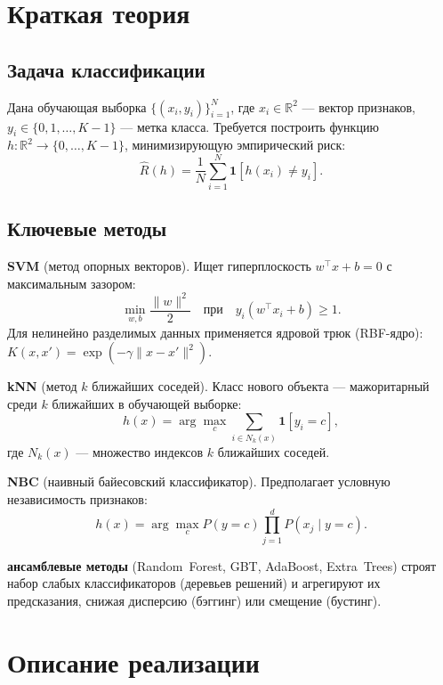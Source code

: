 \documentclass[14pt,a4paper]{extarticle}
\begin{document}
\section*{Краткая теория}

\subsection*{Задача классификации}

Дана обучающая выборка $\{(x_i, y_i)\}_{i=1}^{N}$, где $x_i \in \mathbb{R}^2$ ---
вектор признаков, $y_i \in \{0,1,\ldots,K-1\}$ --- метка класса.
Требуется построить функцию $h: \mathbb{R}^2 \to \{0,\ldots,K-1\}$,
минимизирующую эмпирический риск:
\[
  \hat{R}(h) = \frac{1}{N}\sum_{i=1}^{N}\mathbf{1}[h(x_i) \neq y_i].
\]

\subsection*{Ключевые методы}

\textbf{SVM} (метод опорных векторов).
Ищет гиперплоскость $w^\top x + b = 0$ с максимальным зазором:
\[
  \min_{w,b}\frac{\|w\|^2}{2} \quad\text{при}\quad y_i(w^\top x_i + b) \ge 1.
\]
Для нелинейно разделимых данных применяется ядровой трюк (RBF-ядро):
$K(x,x') = \exp(-\gamma\|x - x'\|^2)$.

\textbf{kNN} (метод $k$ ближайших соседей).
Класс нового объекта --- мажоритарный среди $k$ ближайших в обучающей выборке:
\[
  h(x) = \arg\max_c \sum_{i \in N_k(x)} \mathbf{1}[y_i = c],
\]
где $N_k(x)$ --- множество индексов $k$ ближайших соседей.

\textbf{NBC} (наивный байесовский классификатор).
Предполагает условную независимость признаков:
\[
  h(x) = \arg\max_c P(y=c)\prod_{j=1}^{d}P(x_j \mid y=c).
\]

\textbf{ансамблевые методы} (Random~Forest, GBT, AdaBoost, Extra~Trees) строят
набор слабых классификаторов (деревьев решений) и агрегируют их предсказания,
снижая дисперсию (бэггинг) или смещение (бустинг).

\section*{Описание реализации}
\end{document}

